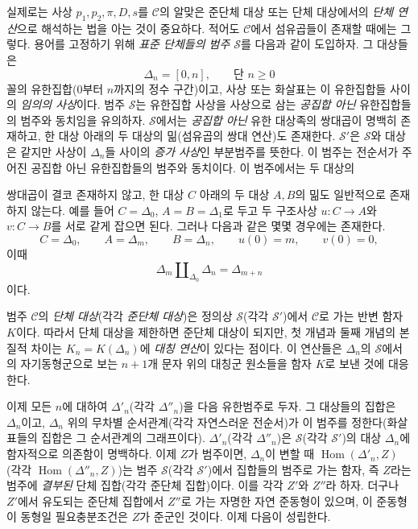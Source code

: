 \documentclass[11pt,twoside,openany]{book}
\numberwithin{equation}{section}
\newcommand{\sourceunit}{front}
\newcommand{\src}[1]{%
  \phantomsection\hypertarget{src:\sourceunit:#1}{}%
  \marginpar{\raggedleft\footnotesize\sffamily #1}%
}
\theoremstyle{plain}
\theoremstyle{definition}
\theoremstyle{remark}
\begin{document}
실제로는 사상 $p_1,p_2,\pi,D,s$를 $\mathcal C$의 알맞은 준단체 대상
또는 단체 대상에서의 \emph{단체 연산}으로 해석하는 법을 아는 것이
중요하다. 적어도 $\mathcal C$에서 섬유곱들이 존재할 때에는 그렇다.
용어를 고정하기 위해 \emph{표준 단체들의 범주 $\mathcal S$}를 다음과
같이 도입하자. 그 대상들은
\[
  \Delta_n=[0,n],\qquad\text{단 }n\geq 0
\]
꼴의 유한집합($0$부터 $n$까지의 정수 구간)이고, 사상 또는 화살표는 이
유한집합들 사이의 \emph{임의의 사상}이다. 범주 $\mathcal S$는 유한집합
사상을 사상으로 삼는 \emph{공집합 아닌} 유한집합들의 범주와 동치임을
유의하자. $\mathcal S$에서는 \emph{공집합 아닌} 유한 대상족의 쌍대곱이
명백히 존재하고, 한 대상 아래의 두 대상의 밂(섬유곱의 쌍대 연산)도
존재한다. $\mathcal S'$은 $\mathcal S$와 대상은 같지만 사상이
$\Delta_n$들 사이의 \emph{증가 사상}인 부분범주를 뜻한다. 이 범주는
전순서가 주어진 공집합 아닌 유한집합들의 범주와 동치이다. 이 범주에서는
두 대상의
\src{108}
쌍대곱이 결코 존재하지 않고, 한 대상 $C$ 아래의 두 대상 $A,B$의 밂도
일반적으로 존재하지 않는다. 예를 들어 $C=\Delta_0$, $A=B=\Delta_1$로
두고 두 구조사상 $u:C\to A$와 $v:C\to B$를 서로 같게 잡으면 된다.
그러나 다음과 같은 몇몇 경우에는 존재한다.
\[
  C=\Delta_0,\qquad A=\Delta_m,\qquad B=\Delta_n,\qquad
  u(0)=m,\qquad v(0)=0,
\]
이때
\[
  \Delta_m\amalg_{\Delta_0}\Delta_n=\Delta_{m+n}
\]
이다.

범주 $\mathcal C$의 \emph{단체 대상}(각각 \emph{준단체 대상})은 정의상
$\mathcal S$(각각 $\mathcal S'$)에서 $\mathcal C$로 가는 반변 함자
$K$이다. 따라서 단체 대상을 제한하면 준단체 대상이 되지만, 첫 개념과
둘째 개념의 본질적 차이는 $K_n=K(\Delta_n)$에 \emph{대칭 연산}이 있다는
점이다. 이 연산들은 $\Delta_n$의 $\mathcal S$에서의 자기동형군으로 보는
$n+1$개 문자 위의 대칭군 원소들을 함자 $K$로 보낸 것에 대응한다.

이제 모든 $n$에 대하여 $\Delta'_n$(각각 $\Delta''_n$)을 다음 유한범주로
두자. 그 대상들의 집합은 $\Delta_n$이고, $\Delta_n$ 위의 무차별
순서관계(각각 자연스러운 전순서)가 이 범주를 정한다(화살표들의 집합은 그
순서관계의 그래프이다). $\Delta'_n$(각각 $\Delta''_n$)은 $\mathcal
S$(각각 $\mathcal S'$)의 대상 $\Delta_n$에 함자적으로 의존함이 명백하다.
이제 $Z$가 범주이면, $\Delta_n$이 변할 때
$\operatorname{Hom}(\Delta'_n,Z)$(각각
$\operatorname{Hom}(\Delta''_n,Z)$)는 범주 $\mathcal S$(각각 $\mathcal
S'$)에서 집합들의 범주로 가는 함자, 즉 $Z$라는 범주에 \emph{결부된}
단체 집합(각각 준단체 집합)이다. 이를 각각 $Z'$와 $Z''$라 하자. 더구나
$Z'$에서 유도되는 준단체 집합에서 $Z''$로 가는 자명한 자연 준동형이
있으며, 이 준동형이 동형일 필요충분조건은 $Z$가 준군인 것이다. 이제
다음이 성립한다.
\end{document}

